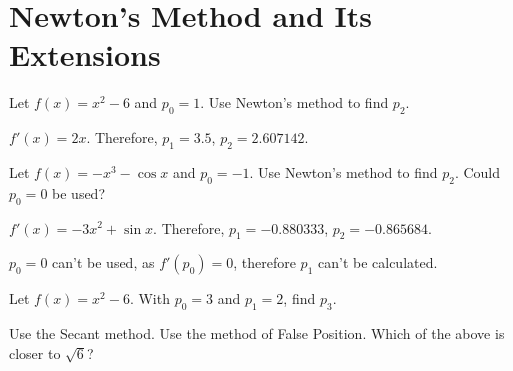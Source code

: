 \documentclass[../../../../Assignments]{subfiles}
\begin{document}
\section{Newton's Method and Its Extensions}

\begin{exercise}
    Let \(f(x) = x^2 - 6\) and \(p_0 = 1\). Use Newton's method to find \(p_2\).
\end{exercise}

\begin{solution}
    \(f'(x) = 2x\). Therefore, \(p_1 = \num{3.5}\), \(p_2 = \num{2.607142}\).
\end{solution}

\begin{exercise}
    Let \(f(x) = -x^3 - \cos{x}\) and \(p_0 = -1\). Use Newton's method to find
    \(p_2\). Could \(p_0 = 0\) be used?
\end{exercise}

\begin{solution}
    \(f'(x) = -3x^2 + \sin{x}\). Therefore, \(p_1 = \num{-0.880333}\), \(p_2 =
    \num{-0.865684}\).

    \(p_0 = 0\) can't be used, as \(f'(p_0) = 0\), therefore \(p_1\) can't be
    calculated.
\end{solution}

\begin{exercise}
    Let \(f(x) = x^2 - 6\). With \(p_0 = 3\) and \(p_1 = 2\), find \(p_3\).

    \begin{tasks}
        \task Use the Secant method.
        \task Use the method of False Position.
        \task Which of the above is closer to \(\sqrt{6}\)?
    \end{tasks}
\end{exercise}
\end{document}
